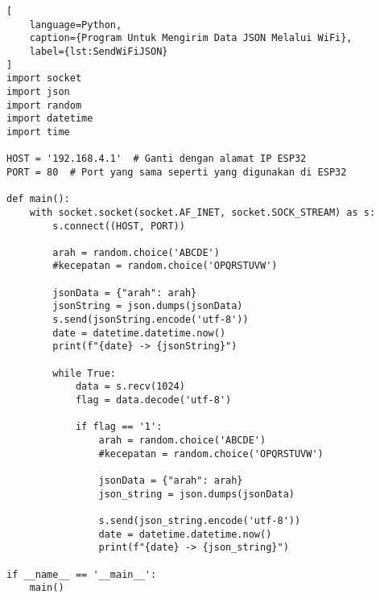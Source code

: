 \begin{lstlisting}[
    language=Python,
    caption={Program Untuk Mengirim Data JSON Melalui WiFi},
    label={lst:SendWiFiJSON}
]
import socket
import json
import random
import datetime
import time

HOST = '192.168.4.1'  # Ganti dengan alamat IP ESP32
PORT = 80  # Port yang sama seperti yang digunakan di ESP32

def main():
    with socket.socket(socket.AF_INET, socket.SOCK_STREAM) as s:
        s.connect((HOST, PORT))
        
        arah = random.choice('ABCDE')
        #kecepatan = random.choice('OPQRSTUVW')
        
        jsonData = {"arah": arah}
        jsonString = json.dumps(jsonData)
        s.send(jsonString.encode('utf-8'))
        date = datetime.datetime.now()
        print(f"{date} -> {jsonString}")
        
        while True:
            data = s.recv(1024)
            flag = data.decode('utf-8')
            
            if flag == '1':
                arah = random.choice('ABCDE')
                #kecepatan = random.choice('OPQRSTUVW')
                
                jsonData = {"arah": arah}
                json_string = json.dumps(jsonData)
                
                s.send(json_string.encode('utf-8'))
                date = datetime.datetime.now()
                print(f"{date} -> {json_string}")

if __name__ == '__main__':
    main()
\end{lstlisting}
